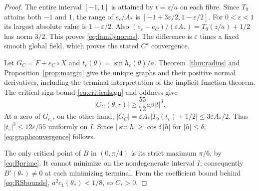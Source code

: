 \documentclass[11pt,a4paper]{article}
\begin{document}
\begin{proof}
The entire interval $[-1,1]$ is attained by $t=z/a$ on each fibre.
Since $T_9$ attains both $-1$ and $1$, the range of
$e_\varepsilon/A_*$ is
$[-1+3\varepsilon/2,1-\varepsilon/2]$. For $0<\varepsilon<1$
its largest absolute value is $1-\varepsilon/2$.
Also $(e_\varepsilon-e_C)/(\varepsilon A_*)=T_9(z/a)+1/2$
has norm $3/2$. This proves \eqref{eq:familynorms}.
The difference is $\varepsilon$ times a fixed smooth global field,
which proves the stated $C^k$ convergence.

Let $G_C=F+e_C\circ X$ and
$t_\varepsilon(\theta)=\sin h_\varepsilon(\theta)/a$.
Theorem~\ref{thm:radius} and Proposition~\ref{prop:margin}
give the unique graphs and their positive normal derivatives,
including the terminal interpretation of the implicit function theorem.
The critical sign bound \eqref{eq:criticalsign} and oddness give
\[
 |G_C(\theta,r)|\ge\frac{55}{72}a\beta|t|^3.
\]
At a zero of $G_{e_\varepsilon}$, on the other hand,
$|G_C|=\varepsilon A_*|T_9(t_\varepsilon)+1/2|
\le3\varepsilon A_*/2$.
Thus $|t_\varepsilon|^3\le12\varepsilon/55$ uniformly on $I$.
Since $|\sin h|\ge\cos\delta\,|h|$ for $|h|\le\delta$,
\eqref{eq:graphconvergence} follows.

The only critical point of $B$ in $(0,\pi/4)$ is its strict maximum
$\pi/6$, by \eqref{eq:Bprime}.
It cannot minimize on the nondegenerate interval $I$; consequently
$B'(\theta_*)\ne0$ at each minimizing terminal.
From the coefficient bound behind \eqref{eq:RSbounds},
$a^2c_1(\theta_*)<1/8$, so $C_*>0$.


\end{proof}
\end{document}
